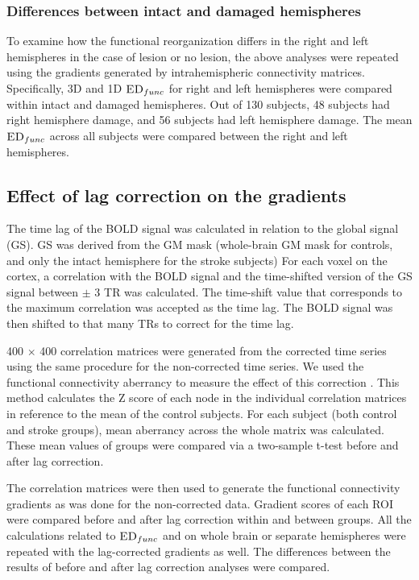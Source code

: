 \documentclass[fleqn,10pt]{wlscirep}
\begin{document}
\subsubsection*{Differences between intact and damaged hemispheres}
To examine how the functional reorganization differs in the right and left hemispheres in the case of lesion or no lesion, the above analyses were repeated using the gradients generated by intrahemispheric connectivity matrices. Specifically, 3D and 1D $\textsc{ED}_{{func}}$ for right and left hemispheres were compared within intact and damaged hemispheres. Out of 130 subjects, 48 subjects had right hemisphere damage, and 56 subjects had left hemisphere damage. The mean $\textsc{ED}_{{func}}$ across all subjects were compared between the right and left hemispheres.%

\subsection*{Effect of lag correction on the gradients}
The time lag of the BOLD signal was calculated in relation to the global signal (GS). GS was derived from the GM mask (whole-brain GM mask for controls, and only the intact hemisphere for the stroke subjects) For each voxel on the cortex, a correlation with the BOLD signal and the time-shifted version of the GS signal between $\pm$ 3 TR was calculated. The time-shift value that corresponds to the maximum correlation was accepted as the time lag. The BOLD signal was then shifted to that many TRs to correct for the time lag. 

400 $\times$ 400 correlation matrices were generated from the corrected time series using the same procedure for the non-corrected time series. We used the functional connectivity aberrancy to measure the effect of this correction \citep{siegel2016effects}. This method calculates the Z score of each node in the individual correlation matrices in reference to the mean of the control subjects. For each subject (both control and stroke groups), mean aberrancy across the whole matrix was calculated. These mean values of groups were compared via a two-sample t-test before and after lag correction.

The correlation matrices were then used to generate the functional connectivity gradients as was done for the non-corrected data. Gradient scores of each ROI were compared before and after lag correction within and between groups. All the calculations related to $\textsc{ED}_{{func}}$ and on whole brain or separate hemispheres were repeated with the lag-corrected gradients as well. The differences between the results of before and after lag correction analyses were compared. 
\end{document}
